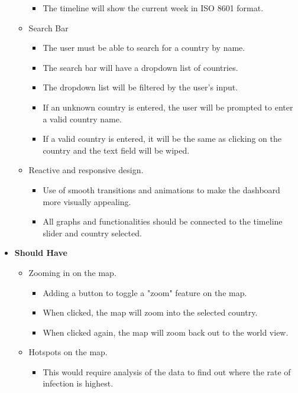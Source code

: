 \documentclass{report}
\begin{document}
\begin{itemize}
\begin{itemize}
\begin{itemize}
            \item The timeline will show the current week in ISO 8601 format.
        \end{itemize}
        \item Search Bar
        \begin{itemize}
            \item The user must be able to search for a country by name.
            \item The search bar will have a dropdown list of countries.
            \item The dropdown list will be filtered by the user's input.
            \item If an unknown country is entered, the user will be prompted to enter a valid country name.
            \item If a valid country is entered, it will be the same as clicking on the country and the text field will be wiped.
        \end{itemize}
        \item Reactive and responsive design.
        \begin{itemize}
            \item Use of smooth transitions and animations to make the dashboard more visually appealing.
            \item All graphs and functionalities should be connected to the timeline slider and country selected.
        \end{itemize}
    \end{itemize}
    \item \textbf{\Large{Should Have}}
    \begin{itemize}
        \item Zooming in on the map.
        \begin{itemize}
            \item Adding a button to toggle a "zoom" feature on the map.
            \item When clicked, the map will zoom into the selected country.
            \item When clicked again, the map will zoom back out to the world view.
        \end{itemize}
        \item Hotspots on the map.
        \begin{itemize}
            \item This would require analysis of the data to find out where the rate of infection is highest.
        \end{itemize}

\end{itemize}
\end{itemize}
\end{document}
